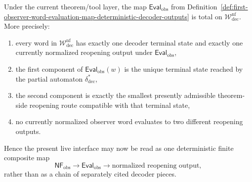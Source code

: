\begin{proposition}
\label{prop:observer-word-evaluation-map-total-current-normal-form-language}
Under the current theorem/tool layer, the map \(\mathsf{Eval}_{\mathrm{obs}}\) from Definition~\ref{def:first-observer-word-evaluation-map-deterministic-decoder-outputs} is total on \(\mathcal W^{\mathrm{nf}}_{\mathrm{dec}}\). More precisely:
\begin{enumerate}[label=(\roman*)]
    \item every word in \(\mathcal W^{\mathrm{nf}}_{\mathrm{dec}}\) has exactly one decoder terminal state and exactly one currently normalized reopening output under \(\mathsf{Eval}_{\mathrm{obs}}\),
    \item the first component of \(\mathsf{Eval}_{\mathrm{obs}}(w)\) is the unique terminal state reached by the partial automaton \(\delta^{\ast}_{\mathrm{dec}}\),
    \item the second component is exactly the smallest presently admissible theorem-side reopening route compatible with that terminal state,
    \item no currently normalized observer word evaluates to two different reopening outputs.
\end{enumerate}
Hence the present live interface may now be read as one deterministic finite composite map
\[
\mathsf{NF}_{\mathrm{obs}}
\longrightarrow
\mathsf{Eval}_{\mathrm{obs}}
\longrightarrow
\text{normalized reopening output},
\]
rather than as a chain of separately cited decoder pieces.
\end{proposition}

